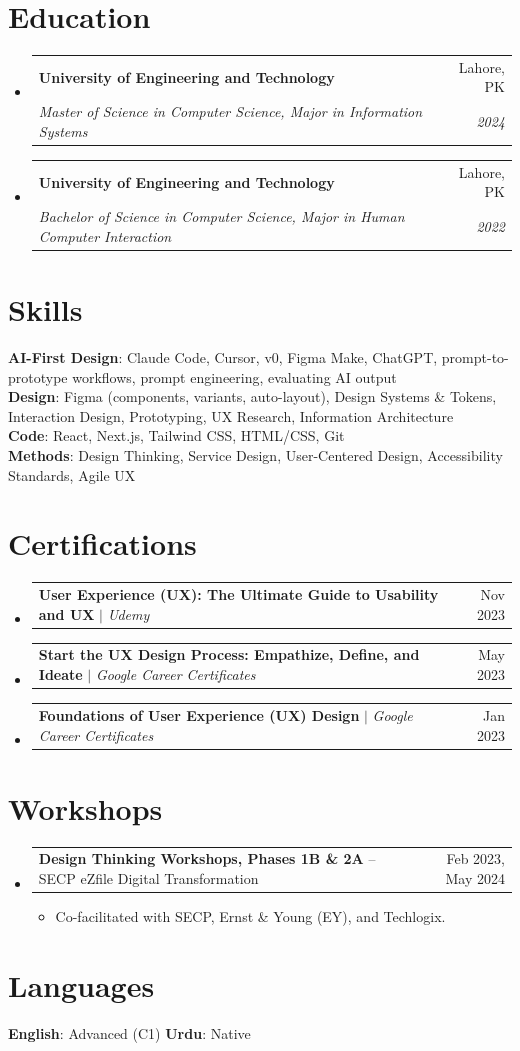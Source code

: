 \documentclass[letterpaper,11pt]{article}
\makeatletter
\newcommand{\resumeItem}[1]{
  \item\small{
    {#1 \vspace{-2pt}}
  }
}
\newcommand{\resumeSubheading}[4]{
  \vspace{-2pt}\item
    \begin{tabular*}{0.97\textwidth}[t]{l@{\extracolsep{\fill}}r}
      \textbf{#1} & #2 \\
      \textit{\small#3} & \textit{\small #4} \\
    \end{tabular*}\vspace{-7pt}
}
\newcommand{\resumeProjectHeading}[2]{
    \item
    \begin{tabular*}{0.97\textwidth}{l@{\extracolsep{\fill}}r}
      \small#1 & #2 \\
    \end{tabular*}\vspace{-7pt}
}
\newcommand{\resumeSubHeadingListStart}{\begin{itemize}[leftmargin=0.15in, label={}]}
\newcommand{\resumeSubHeadingListEnd}{\end{itemize}}
\newcommand{\resumeItemListStart}{\begin{itemize}}
\newcommand{\resumeItemListEnd}{\end{itemize}\vspace{-5pt}}
\makeatother
\begin{document}
\section{Education}
  \resumeSubHeadingListStart
    \resumeSubheading
      {University of Engineering and Technology}{Lahore, PK}
      {Master of Science in Computer Science, Major in Information Systems}{2024}
    \resumeSubheading
      {University of Engineering and Technology}{Lahore, PK}
      {Bachelor of Science in Computer Science, Major in Human Computer Interaction}{2022}
  \resumeSubHeadingListEnd


\section{Skills}
 \begin{itemize}[leftmargin=0.15in, label={}]
    \small{\item{
     \textbf{AI-First Design}{: Claude Code, Cursor, v0, Figma Make, ChatGPT, prompt-to-prototype workflows, prompt engineering, evaluating AI output} \\
     \textbf{Design}{: Figma (components, variants, auto-layout), Design Systems \& Tokens, Interaction Design, Prototyping, UX Research, Information Architecture} \\
     \textbf{Code}{: React, Next.js, Tailwind CSS, HTML/CSS, Git} \\
     \textbf{Methods}{: Design Thinking, Service Design, User-Centered Design, Accessibility Standards, Agile UX}
    }}
 \end{itemize}


\section{Certifications}
    \resumeSubHeadingListStart
      \resumeProjectHeading
          {\textbf{User Experience (UX): The Ultimate Guide to Usability and UX} $|$ \emph{Udemy}}{Nov 2023}
      \resumeProjectHeading
          {\textbf{Start the UX Design Process: Empathize, Define, and Ideate} $|$ \emph{Google Career Certificates}}{May 2023}
      \resumeProjectHeading
          {\textbf{Foundations of User Experience (UX) Design} $|$ \emph{Google Career Certificates}}{Jan 2023}
    \resumeSubHeadingListEnd


\section{Workshops}
    \resumeSubHeadingListStart
      \resumeProjectHeading
          {\textbf{Design Thinking Workshops, Phases 1B \& 2A} -- SECP eZfile Digital Transformation}{Feb 2023, May 2024}
          \resumeItemListStart
            \resumeItem{Co-facilitated with SECP, Ernst \& Young (EY), and Techlogix.}
          \resumeItemListEnd
    \resumeSubHeadingListEnd


\section{Languages}
 \begin{itemize}[leftmargin=0.15in, label={}]
    \small{\item{
     \textbf{English}{: Advanced (C1)} \quad
     \textbf{Urdu}{: Native}
    }}
 \end{itemize}


\end{document}
